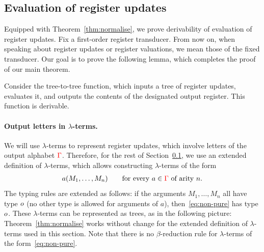\subsection{Evaluation of register updates}
\label{sec:updates-endgame}
Equipped with Theorem~\ref{thm:normalise}, we  prove derivability of  evaluation of  register updates. 
Fix a first-order register transducer.
From now on, when speaking about register updates or register valuations, we mean those of the fixed transducer. 
Our goal is to prove the following lemma, which completes the proof of our main theorem.
\begin{lemma}\label{lem:derive-register-updates}
    Consider
    the   tree-to-tree function, which inputs a tree of  register updates, evaluates it, and outputs the  contents of the designated output register. This function is derivable. 
\end{lemma}

\paragraph*{Output letters in $\lambda$-terms.} We will   use $\lambda$-terms to represent register updates, which involve letters of the output alphabet ${\color{red}{\Gamma}}$. Therefore, for the  rest of Section~\ref{sec:updates-endgame}, we use an extended definition of $\lambda$-terms, which allows  constructing $\lambda$-terms of the form 
\begin{align}\label{eq:non-pure}
a(M_1,\ldots,M_n) \qquad \text{for every $a \in {\color{red}{\Gamma}}$ of arity $n$.}
\end{align}
The typing rules are extended as follows: if the arguments $M_1,\ldots,M_n$ all have type $o$ (no other type is allowed for arguments of $a$),  then~\eqref{eq:non-pure} has type $o$. These $\lambda$-terms can  be represented as trees, as in the following picture:
Theorem~\ref{thm:normalise} works without change for the extended definition of  $\lambda$-terms used in this section. Note that there is no $\beta$-reduction rule for $\lambda$-terms of the form~\eqref{eq:non-pure}.


